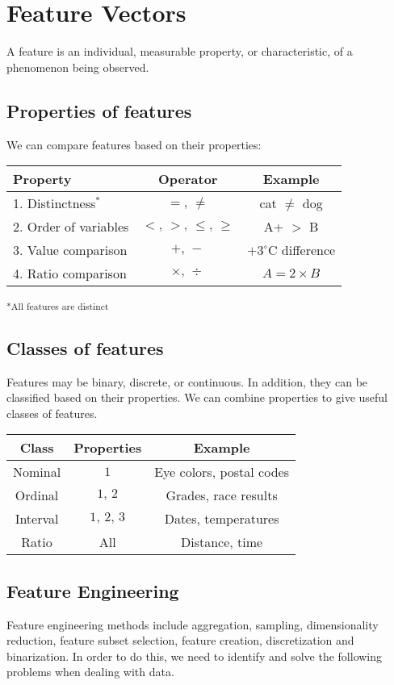 \documentclass[9pt,twocolumn]{article}
\begin{document}
\section{Feature Vectors}
A feature is an individual, measurable property, or characteristic, of a phenomenon being observed.

	\subsection*{Properties of features}
		We can compare features based on their properties:
		\begin{center}
		\begin{tabular}{|l|c|c|} 
		\hline
		Property & Operator & Example\\
		\hline
		1. Distinctness$^*$& $=,\,\neq$ & cat $\neq$ dog\\
		2. Order of variables& $<,\,>,\,\leq,\,\geq$ & A+ $>$ B\\
		3. Value comparison & $+,\,-$ & $+3^{\circ}\mathrm{C}$ difference\\
		4. Ratio comparison & $\times,\,\div $ & $A = 2\times B$ \\
		\hline
		\end{tabular}
		\end{center}
		\textsuperscript{*All features are distinct}

	\subsection*{Classes of features}
		Features may be binary, discrete, or continuous. In addition, they can be classified based on their properties. We can combine properties to give useful classes of features.

		\begin{center}
		\begin{tabular}{|c|c|c|} 
		\hline
		Class & Properties & Example\\
		\hline
		Nominal & $1$ & Eye colors, postal codes\\
		Ordinal & $1,\,2$ & Grades, race results\\
		Interval & $1,\,2,\,3$ & Dates, temperatures\\
		Ratio & All & Distance, time\\
		\hline
		\end{tabular}
		\end{center}

\subsection*{Feature Engineering}
Feature engineering methods include aggregation, sampling, dimensionality reduction, feature subset selection, feature creation, discretization and binarization. In order to do this, we need to identify and solve the following problems when dealing with data.
\end{document}

